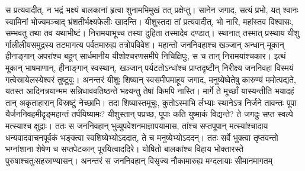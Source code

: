 \vakya स प्रत्यवादीत्, न भद्रं भक्ष्यं बालकानां हृत्वा शुनामभिमुखं तत् प्रक्षेप्तु।
\vakya सानेन जगाद, सत्यं प्रभो, यत् श्वानः स्वामिनां भोज्यमञ्चाद् भ्रंशतीर्भक्ष्यफेलीः खादन्ति।
\vakya यीशुस्तदा तां प्रत्यवादीत्, भो नारि, महांस्तव विश्वासः, सम्भवतु तथा तव यथाभीष्टं। निरामयाभूच्च तस्या दुहिता तस्मादेव दण्डात्।
\vakya स्थानात् तस्मात् प्रस्थाय यीशु र्गालीलीयसमुद्रस्य तटमागत्य पर्वतमारुह्य तत्रोपविवेश।
\vakya महान्तो जननिवहाश्च खञ्जान् अन्धान् मूकान् हीनाङ्गान् अपरांश्च बहून् सार्धमानीय यीशोश्चरणसमीपे निचिक्षिपुः, स च तान् निरामयांश्चकार।
\vakya इत्थं मूकान् भाषमाणान्, हीनाङ्गान् स्वस्थान्, खञ्जान् पर्यटतोऽन्धांश्च प्राप्तदृष्टीन् निरीक्ष्य जननिवहा विस्मयं गत्वेस्रायेलस्येश्वरं तुष्टुवुः।
\vakya अनन्तरं यीशुः शिष्यान् स्वसमीपमाहूय जगाद, मनुष्येष्वेतेषु कारुण्यं ममोत्पद्यते, यतस्त आदिनत्रयान्मम सन्निधाववतिष्ठन्ते भक्ष्यन्तु तेषां किमपि नास्ति। मार्गे ते मूर्च्छां यास्यन्तीति भयादहं तान् अकृताहारान् विस्रष्टुं नेच्छामि।
\vakya तदा शिष्यास्तमूचुः, कुतोऽस्माभि र्लभ्याः स्थानेऽत्र निर्जने तावन्तः पूपा यैर्जननिवहमीदृङ्महान्तं तर्पयिष्यामः?
\vakya यीशुस्तान् पप्रच्छ, पूपाः कति युष्माकं विद्यन्ते? ते जगदुः सप्त स्वल्पे मत्स्याश्च क्षुद्राः।
\vakya ततः स जननिवहान् भुव्युपवेशनमाज्ञापयामास,
\vakya तांश्च सप्तपूपान् मत्स्यांश्चादाय धन्यवादवाचनपूर्वकं भङ्क्त्वा स्वशिष्येभ्योऽददात्, ते च मनुष्येभ्योऽददन्।
\vakya ततः सर्वे भुक्त्वा तृप्तवन्तो भग्नांशाना शेषेण च सप्तपेटकान् पूरयित्वाददिरे।
\vakya योषितो बालकांश्च विहाय भोक्तारस्ते पुरुषाश्चतुःसहस्राण्यासन्।
\vakya अनन्तरं स जननिवहान् विसृज्य नौकामारुह्य मग्दलायाः सीमानमागतम्\eoc